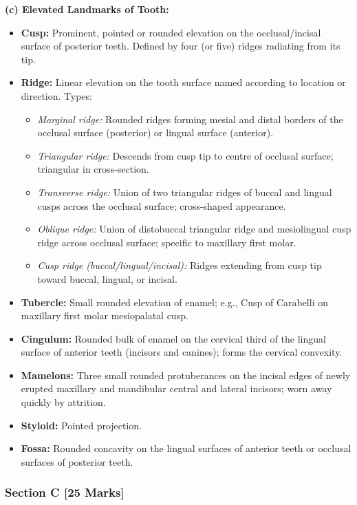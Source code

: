 \documentclass[11pt,a4paper]{article}
\begin{document}
\begin{ansbox}
\textbf{(c) Elevated Landmarks of Tooth:}

\begin{itemize}[leftmargin=*]
    \item \textbf{Cusp:} Prominent, pointed or rounded elevation on the occlusal/incisal surface of posterior teeth. Defined by four (or five) ridges radiating from its tip.
    \item \textbf{Ridge:} Linear elevation on the tooth surface named according to location or direction. Types:
    \begin{itemize}
        \item \textit{Marginal ridge:} Rounded ridges forming mesial and distal borders of the occlusal surface (posterior) or lingual surface (anterior).
        \item \textit{Triangular ridge:} Descends from cusp tip to centre of occlusal surface; triangular in cross-section.
        \item \textit{Transverse ridge:} Union of two triangular ridges of buccal and lingual cusps across the occlusal surface; cross-shaped appearance.
        \item \textit{Oblique ridge:} Union of distobuccal triangular ridge and mesiolingual cusp ridge across occlusal surface; specific to maxillary first molar.
        \item \textit{Cusp ridge (buccal/lingual/incisal):} Ridges extending from cusp tip toward buccal, lingual, or incisal.
    \end{itemize}
    \item \textbf{Tubercle:} Small rounded elevation of enamel; e.g., Cusp of Carabelli on maxillary first molar mesiopalatal cusp.
    \item \textbf{Cingulum:} Rounded bulk of enamel on the cervical third of the lingual surface of anterior teeth (incisors and canines); forms the cervical convexity.
    \item \textbf{Mamelons:} Three small rounded protuberances on the incisal edges of newly erupted maxillary and mandibular central and lateral incisors; worn away quickly by attrition.
    \item \textbf{Styloid:} Pointed projection.
    \item \textbf{Fossa:} Rounded concavity on the lingual surfaces of anterior teeth or occlusal surfaces of posterior teeth.
\end{itemize}
\end{ansbox}

\subsubsection{Section C [25 Marks]}
\end{document}
